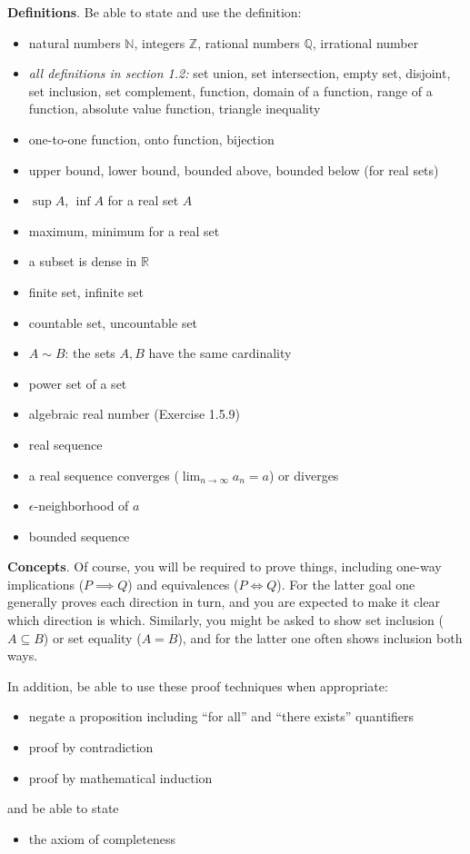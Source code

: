 \documentclass[12pt]{amsart}
\newcommand{\bigspacing}{\renewcommand{\baselinestretch}{1.15}\tiny\normalsize}
\newcommand{\NN}{{\mathbb{N}}}
\newcommand{\QQ}{{\mathbb{Q}}}
\newcommand{\RR}{{\mathbb{R}}}
\newcommand{\ZZ}{{\mathbb{Z}}}
\newcommand{\eps}{\epsilon}
\begin{document}
\bigspacing
\noindent \textbf{Definitions}.  Be able to state and use the definition:
\begin{itemize}
\item natural numbers $\NN$, integers $\ZZ$, rational numbers $\QQ$, irrational number
\item \emph{all definitions in section 1.2:} set union, set intersection, empty set, disjoint, set inclusion, set complement, function, domain of a function, range of a function, absolute value function, triangle inequality
\item one-to-one function, onto function, bijection
\item upper bound, lower bound, bounded above, bounded below (for real sets)
\item $\sup A$, $\inf A$ for a real set $A$
\item maximum, minimum for a real set
\item a subset is dense in $\RR$
\item finite set, infinite set
\item countable set, uncountable set
\item $A\sim B$: the sets $A,B$ have the same cardinality
\item power set of a set
\item algebraic real number (Exercise 1.5.9)
\item real sequence
\item a real sequence converges ($\lim_{n\to\infty} a_n = a$) or diverges
\item $\eps$-neighborhood of $a$
\item bounded sequence
\end{itemize}

\bigskip
\noindent \textbf{Concepts}.  Of course, you will be required to prove things, including one-way implications ($P\implies Q$) and equivalences ($P\iff Q$).  For the latter goal one generally proves each direction in turn, and you are expected to make it clear which direction is which.  Similarly, you might be asked to show set inclusion ($A \subseteq B$) or set equality ($A=B$), and for the latter one often shows inclusion both ways.

In addition, be able to use these proof techniques when appropriate:
\begin{itemize}
\item negate a proposition including ``for all'' and ``there exists'' quantifiers
\item proof by contradiction
\item proof by mathematical induction
\end{itemize}
and be able to state
\begin{itemize}
\item the axiom of completeness
\end{itemize}
\bigskip
\end{document}

